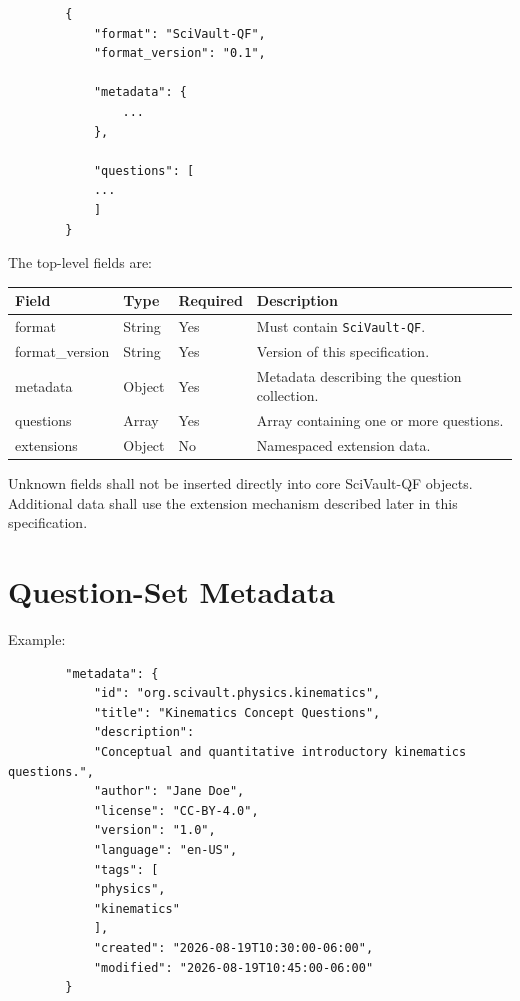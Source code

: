 \documentclass[11pt]{article}
\begin{document}
	\begin{lstlisting}
		{
			"format": "SciVault-QF",
			"format_version": "0.1",
			
			"metadata": {
				...
			},
			
			"questions": [
			...
			]
		}
	\end{lstlisting}
	
	The top-level fields are:
	
	\begin{longtable}{|>{\ttfamily}p{3.0cm}|p{2.0cm}|p{1.7cm}|p{7.5cm}|}
		\hline
		\textbf{Field} & \textbf{Type} & \textbf{Required} &
		\textbf{Description} \\ \hline
		\endfirsthead
		
		format & String & Yes &
		Must contain \texttt{SciVault-QF}. \\ \hline
		
		format\_version & String & Yes &
		Version of this specification. \\ \hline
		
		metadata & Object & Yes &
		Metadata describing the question collection. \\ \hline
		
		questions & Array & Yes &
		Array containing one or more questions. \\ \hline
		
		extensions & Object & No &
		Namespaced extension data. \\ \hline
		
	\end{longtable}
	
	Unknown fields shall not be inserted directly into core SciVault-QF
	objects. Additional data shall use the extension mechanism described later
	in this specification.
	
	\section{Question-Set Metadata}
	
	Example:
	
	\begin{lstlisting}
		"metadata": {
			"id": "org.scivault.physics.kinematics",
			"title": "Kinematics Concept Questions",
			"description":
			"Conceptual and quantitative introductory kinematics questions.",
			"author": "Jane Doe",
			"license": "CC-BY-4.0",
			"version": "1.0",
			"language": "en-US",
			"tags": [
			"physics",
			"kinematics"
			],
			"created": "2026-08-19T10:30:00-06:00",
			"modified": "2026-08-19T10:45:00-06:00"
		}
	\end{lstlisting}
	
\end{document}
